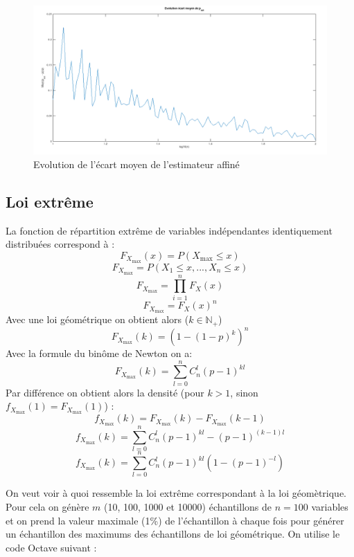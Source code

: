 \documentclass[12pt,a4paper,titlepage]{article}
\numberwithin{equation}{section}
\begin{document}
\begin{figure}[!h]
\begin{center}
 \includegraphics[scale=0.3]{images/biaisMoyGeomBis.png} 
\end{center}
 \caption{Evolution de l'écart moyen de l'estimateur affiné}
 \label{Evolution de l'ecart moyen de de l'estimateur affiné geom}
\end{figure}


\subsection{Loi extrême}

La fonction de répartition extrême de variables indépendantes identiquement distribuées correspond à :
\[F_{X_{\max }}\left( x \right)  = P\left( {{X_{\max }} \le x} \right)\]
\[F_{X_{\max }}  = P\left( {{X_1} \le x,...,{X_n} \le x} \right)\]
\[F_{X_{\max }} = \prod\limits_{i = 1}^n {{F_X}\left( x \right)} \]
\[F_{X_{\max }} = {F_X}\left( x \right)^n\]
Avec une loi géométrique on obtient alors ($k\in{\mathbb{N}_+}$)
\[F_{X_{\max }}(k) = (1-(1-p)^{k})^n\]
Avec la formule du binôme de Newton on a:
\[F_{X_{\max }}(k) = \sum\limits_{l=0}^{n}C^{l}_{n}(p-1)^{kl}\]
Par différence on obtient alors la densité (pour $k>1$, sinon $f_{X_{\max }}(1) = F_{X_{\max }}(1)$) :
\[f_{X_{\max }}(k)=F_{X_{\max }}(k)-F_{X_{\max }}(k-1)\]
\[f_{X_{\max }}(k)=\sum\limits_{l=0}^{n}C^{l}_{n}(p-1)^{kl}-(p-1)^{(k-1)l}\]
\[f_{X_{\max }}(k)=\sum\limits_{l=0}^{n}C^{l}_{n}(p-1)^{kl}(1-(p-1)^{-l})\]


On veut voir à quoi ressemble la loi extrême correspondant à la loi géomètrique. Pour cela on génère $m$ (10, 100, 1000 et 10000) échantillons de $n=100$ variables et on prend la valeur maximale (1\%) de l'échantillon à chaque fois pour générer un échantillon des maximums des échantillons de loi géométrique. On utilise le code Octave suivant :
\end{document}
